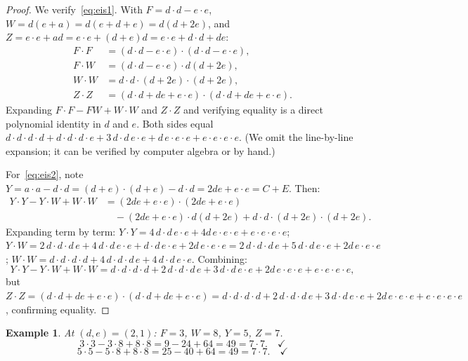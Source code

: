 \documentclass[11pt]{article}
\newtheorem{example}[definition]{Example}
\begin{document}
\begin{proof}
We verify~\eqref{eq:eis1}.  With $F = d\cdot d - e\cdot e$, $W = d(e+a) = d(e + d + e) = d(d + 2e)$, and $Z = e\cdot e + ad = e\cdot e + (d+e)d = e\cdot e + d\cdot d + de$:
\begin{align*}
  F\cdot F &= (d\cdot d - e\cdot e)\cdot(d\cdot d - e\cdot e), \\
  F\cdot W &= (d\cdot d - e\cdot e)\cdot d(d+2e), \\
  W\cdot W &= d\cdot d\cdot(d+2e)\cdot(d+2e), \\
  Z\cdot Z &= (d\cdot d + de + e\cdot e)\cdot(d\cdot d + de + e\cdot e).
\end{align*}
Expanding $F\cdot F - FW + W\cdot W$ and $Z\cdot Z$ and verifying equality is a direct polynomial identity in $d$ and $e$.  Both sides equal $d\cdot d\cdot d\cdot d + d\cdot d\cdot d\cdot e + 3\,d\cdot d\,e\cdot e + d\,e\cdot e\cdot e + e\cdot e\cdot e\cdot e$.  (We omit the line-by-line expansion; it can be verified by computer algebra or by hand.)

For~\eqref{eq:eis2}, note $Y = a\cdot a - d\cdot d = (d+e)\cdot(d+e) - d\cdot d = 2de + e\cdot e = C + E$.  Then:
\begin{align*}
Y\cdot Y - Y\cdot W + W\cdot W &= (2de + e\cdot e)\cdot(2de + e\cdot e) \\
  &\quad - (2de + e\cdot e)\cdot d(d+2e) + d\cdot d\cdot(d+2e)\cdot(d+2e).
\end{align*}
Expanding term by term: $Y\cdot Y = 4\,d\cdot d\,e\cdot e + 4d\,e\cdot e\cdot e + e\cdot e\cdot e\cdot e$; $Y\cdot W = 2\,d\cdot d\cdot d\,e + 4\,d\cdot d\,e\cdot e + d\cdot d\,e\cdot e + 2d\,e\cdot e\cdot e = 2\,d\cdot d\cdot d\,e + 5\,d\cdot d\,e\cdot e + 2d\,e\cdot e\cdot e$; $W\cdot W = d\cdot d\cdot d\cdot d + 4\,d\cdot d\cdot d\,e + 4\,d\cdot d\,e\cdot e$.  Combining:
\[
  Y\cdot Y - Y\cdot W + W\cdot W = d\cdot d\cdot d\cdot d + 2\,d\cdot d\cdot d\,e + 3\,d\cdot d\,e\cdot e + 2d\,e\cdot e\cdot e + e\cdot e\cdot e\cdot e,
\]
but $Z\cdot Z = (d\cdot d + de + e\cdot e)\cdot(d\cdot d + de + e\cdot e) = d\cdot d\cdot d\cdot d + 2\,d\cdot d\cdot d\,e + 3\,d\cdot d\,e\cdot e + 2d\,e\cdot e\cdot e + e\cdot e\cdot e\cdot e$, confirming equality.
\end{proof}

\begin{example}
At $(d,e) = (2,1)$: $F = 3$, $W = 8$, $Y = 5$, $Z = 7$.
\[
  3\cdot 3 - 3\cdot 8 + 8\cdot 8 = 9 - 24 + 64 = 49 = 7\cdot 7. \quad\checkmark
\]
\[
  5\cdot 5 - 5\cdot 8 + 8\cdot 8 = 25 - 40 + 64 = 49 = 7\cdot 7. \quad\checkmark
\]
\end{example}
\end{document}
